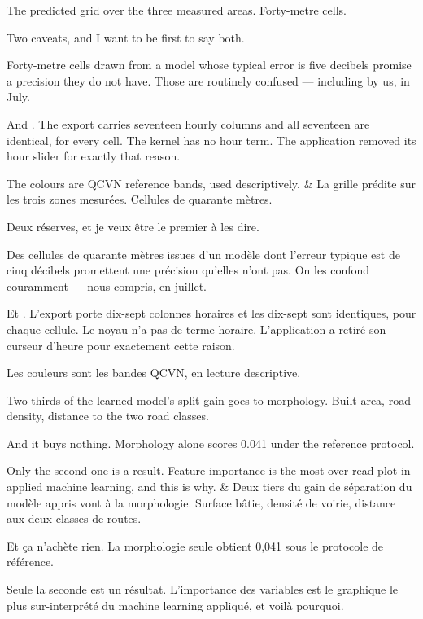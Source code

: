 \documentclass[10pt,a4paper]{article}
\begin{document}
\begin{say}
The predicted grid over the three measured areas. Forty-metre cells.

Two caveats, and I want to be first to say both.

 Forty-metre cells drawn from a model
whose typical error is five decibels promise a precision they do not have. Those
are routinely confused --- including by us, in July.

And . The export carries seventeen hourly columns and all
seventeen are identical, for every cell. The kernel has no hour term. The
application removed its hour slider for exactly that reason. 

The colours are QCVN reference bands, used descriptively. 
&
La grille prédite sur les trois zones mesurées. Cellules de quarante mètres.

Deux réserves, et je veux être le premier à les dire.

 Des cellules de quarante mètres
issues d'un modèle dont l'erreur typique est de cinq décibels promettent une
précision qu'elles n'ont pas. On les confond couramment --- nous compris, en
juillet.

Et . L'export porte dix-sept colonnes horaires et les
dix-sept sont identiques, pour chaque cellule. Le noyau n'a pas de terme horaire.
L'application a retiré son curseur d'heure pour exactement cette raison.

Les couleurs sont les bandes QCVN, en lecture descriptive. 
\end{say}

\begin{say}
Two thirds of the learned model's split gain goes to morphology. Built area, road
density, distance to the two road classes.

And it buys nothing. Morphology alone scores 0.041 under the reference protocol.

 Only the second one is a result. Feature importance is the most
over-read plot in applied machine learning, and this is why.
&
Deux tiers du gain de séparation du modèle appris vont à la morphologie. Surface
bâtie, densité de voirie, distance aux deux classes de routes.

Et ça n'achète rien. La morphologie seule obtient 0,041 sous le protocole de
référence.

 Seule la seconde est un résultat. L'importance des
variables est le graphique le plus sur-interprété du machine learning appliqué, et
voilà pourquoi.
\end{say}
\end{document}
